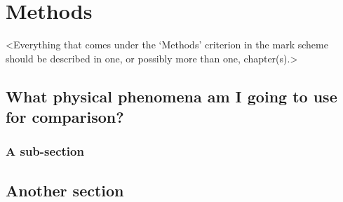 \chapter{Methods}
\label{chapter2}

<Everything that comes under the `Methods' criterion in the mark scheme should be described in one, or possibly more than one, chapter(s).>

\section{What physical phenomena am I going to use for comparison?}
\lipsum[5]

\subsection{A sub-section}
\lipsum[6]

\section{Another section}
\lipsum[7]
